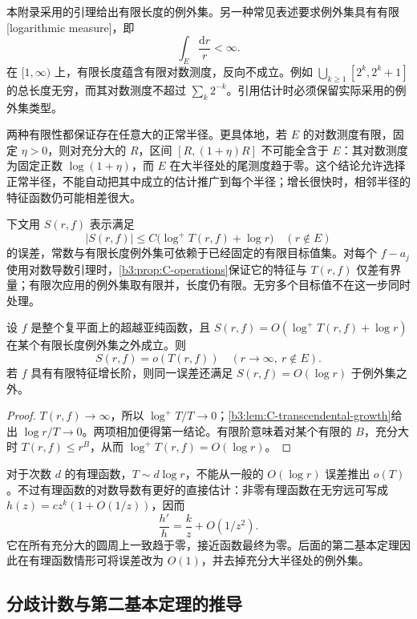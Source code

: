 本附录采用的引理给出有限长度的例外集。另一种常见表述要求例外集具有有限[logarithmic measure]，即
\[
 \int_E\frac{\mathrm{d}r}{r}<\infty.
\]
在 \([1,\infty)\) 上，有限长度蕴含有限对数测度，反向不成立。例如 \(\bigcup_{k\ge1}[2^k,2^k+1]\) 的总长度无穷，而其对数测度不超过 \(\sum_k2^{-k}\)。引用估计时必须保留实际采用的例外集类型。

\ProseParagraphBreak

两种有限性都保证存在任意大的正常半径。更具体地，若 \(E\) 的对数测度有限，固定 \(\eta>0\)，则对充分大的 \(R\)，区间 \([R,(1+\eta)R]\) 不可能全含于 \(E\)：其对数测度为固定正数 \(\log(1+\eta)\)，而 \(E\) 在大半径处的尾测度趋于零。这个结论允许选择正常半径，不能自动把其中成立的估计推广到每个半径；增长很快时，相邻半径的特征函数仍可能相差很大。

\ProseParagraphBreak

下文用 \(S(r,f)\) 表示满足
\[
 |S(r,f)|\le C\bigl(\log^+T(r,f)+\log r\bigr)
 \quad(r\notin E)
\]
的误差，常数与有限长度例外集可依赖于已经固定的有限目标值集。对每个 \(f-a_j\) 使用对数导数引理时，\cref{b3:prop:C-operations}保证它的特征与 \(T(r,f)\) 仅差有界量；有限次应用的例外集取有限并，长度仍有限。无穷多个目标值不在这一步同时处理。

\begin{proposition}[误差相对于主量的大小]\label{b3:prop:C-small-error}
设 \(f\) 是整个复平面上的超越亚纯函数，且 \(S(r,f)=O(\log^+T(r,f)+\log r)\) 在某个有限长度例外集之外成立。则
\[
 S(r,f)=o(T(r,f))\quad(r\to\infty,\ r\notin E).
\]
若 \(f\) 具有有限特征增长阶，则同一误差还满足 \(S(r,f)=O(\log r)\) 于例外集之外。
\end{proposition}
\begin{proof}
\(T(r,f)\to\infty\)，所以 \(\log^+T/T\to0\)；\cref{b3:lem:C-transcendental-growth}给出 \(\log r/T\to0\)。两项相加便得第一结论。有限阶意味着对某个有限的 \(B\)，充分大时 \(T(r,f)\le r^B\)，从而 \(\log^+T(r,f)=O(\log r)\)。
\end{proof}

对于次数 \(d\) 的有理函数，\(T\sim d\log r\)，不能从一般的 \(O(\log r)\) 误差推出 \(o(T)\)。不过有理函数的对数导数有更好的直接估计：非零有理函数在无穷远可写成 \(h(z)=c z^k(1+O(1/z))\)，因而
\[
 \frac{h'}h=\frac kz+O(1/z^2).
\]
它在所有充分大的圆周上一致趋于零，接近函数最终为零。后面的第二基本定理因此在有理函数情形可将误差改为 \(O(1)\)，并去掉充分大半径处的例外集。

\subsection{分歧计数与第二基本定理的推导}
\label{b3:subsec:C0303}

